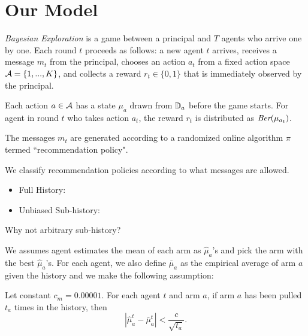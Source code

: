 \section{Our Model}
\label{sec:model}

\emph{Bayesian Exploration} is a game between a principal and $T$ agents who arrive one by one. Each round $t$ proceeds as follows: a new agent $t$ arrives, receives a message $m_t$ from the principal, chooses an action $a_t$ from a fixed action space $\mathcal{A} = \{1,...,K\}$, and collects a reward $r_t\in \{0,1\}$ that is immediately observed by the principal. 

Each action $a \in \mathcal{A}$ has a state $\mu_a$ drawn from $\mathbb{D}_a$ before the game starts. For agent in round $t$ who takes action $a_t$, the reward $r_t$ is distributed as $\emph{Ber}(\mu_{a_t})$.  

The messages $m_t$ are generated according to a randomized online algorithm $\pi$ termed ``recommendation policy".

 We classify recommendation policies according to what messages are allowed. 
\begin{itemize}
\item Full History: 
\item Unbiased Sub-history: 
\end{itemize}

\begin{remark}
Why not arbitrary sub-history?
\end{remark}

 We assumes agent estimates the mean of each arm as $\hat{\mu}_a$'s and pick the arm with the best $\hat{\mu}_a$'s. For each agent, we also define $\bar{\mu}_a$ as the empirical average of arm $a$ given the history and we make the following assumption:
\begin{assumption}
\label{ass:embehave}
Let constant $c_m = 0.00001$. For each agent $t$ and arm $a$, if arm $a$ has been pulled $t_a$ times in the history, then
\[
|\hat{\mu}^t_a - \bar{\mu}^t_a | < \frac{c}{\sqrt{t_a}}.
\]
\end{assumption}


